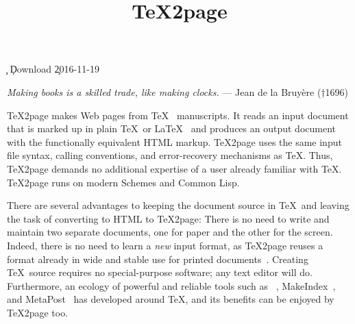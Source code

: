 %




\ifx\TZPtitle\UnDeFiNeD
\def\TZPtitle{TeX2page}\fi

\title{\TeX2page}

\smallskip

\c{}
%
\ifx\inpltdist\Undefined
\ifx\shipout\UnDeFiNeD
\c{Download
}
\else
\c{2016-11-19} %
\fi
\fi
%


\ifx\shipout\UnDeFiNeD
\centerline{}
\fi

{\obeylines\raggedleft
\ifx\shipout\UnDeFiNeD\small\else\eightfont\fi
{\it Making books is a skilled trade,
like making clocks.}
— Jean de la Bruyère (†1696)
}


\medskip


\n
\TeX2page
makes Web pages
from \TeX~\cite{tex} manuscripts.
It reads an
input document that is marked up in
plain \TeX\ or \LaTeX~\cite{latex}
and
produces an output document with the functionally
equivalent HTML markup.
\TeX2page uses the same input
file syntax, calling conventions, and  error-recovery
mechanisms as \TeX.  Thus, \TeX2page demands no additional
expertise of a user already familiar with \TeX.
\TeX2page runs on modern Schemes and Common Lisp.

There are several advantages to keeping the document
source in \TeX\ and leaving the task of converting to
HTML to \TeX2page:  There is no need to write and
maintain two separate documents, one for paper and the
other for the screen.  Indeed, there is no need to
learn a {\em new} input format, as \TeX2page reuses a
format already in wide and stable use for printed
documents~\cite{tug,ctan}.  Creating \TeX\
source requires no special-purpose software; any text
editor will do.  Furthermore, an ecology of powerful and
reliable tools such as \BibTeX~\cite{bibtex},
MakeIndex~\cite{makeindex}, and
MetaPost~\cite{metapost} has developed around \TeX, and
its benefits can be enjoyed by \TeX2page too.

